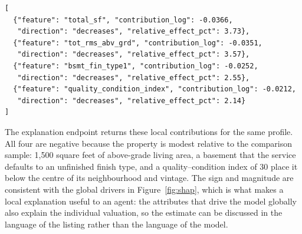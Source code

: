 {\footnotesize
\begin{verbatim}
[
  {"feature": "total_sf", "contribution_log": -0.0366,
   "direction": "decreases", "relative_effect_pct": 3.73},
  {"feature": "tot_rms_abv_grd", "contribution_log": -0.0351,
   "direction": "decreases", "relative_effect_pct": 3.57},
  {"feature": "bsmt_fin_type1", "contribution_log": -0.0252,
   "direction": "decreases", "relative_effect_pct": 2.55},
  {"feature": "quality_condition_index", "contribution_log": -0.0212,
   "direction": "decreases", "relative_effect_pct": 2.14}
]
\end{verbatim}
}

The explanation endpoint returns these local contributions for the same profile. All
four are negative because the property is modest relative to the comparison sample:
1,500 square feet of above-grade living area, a basement that the service defaults to
an unfinished finish type, and a quality--condition index of 30 place it below the
centre of its neighbourhood and vintage. The sign and magnitude are consistent with
the global drivers in Figure~\ref{fig:shap}, which is what makes a local explanation
useful to an agent: the attributes that drive the model globally also explain the
individual valuation, so the estimate can be discussed in the language of the listing
rather than the language of the model.
